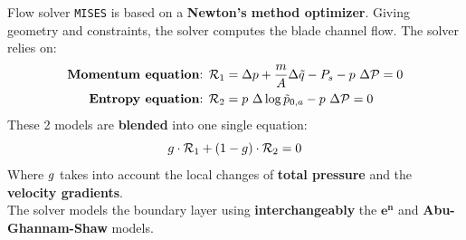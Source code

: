 \begin{frame}{Flow solver}
    \texttt{MISES} is based on a \textbf{Newton's method optimizer}. Giving geometry and constraints, the solver computes the blade channel flow. 
    The solver relies on:
    \begin{align*}
        \text{\textbf{Momentum equation}: }\mathcal{R}_1 & = \Delta p + \frac{m}{A} \Delta \tilde{q} - P_s - p \ \Delta \mathcal{P} = 0 \\
        \text{\textbf{Entropy equation}: }\mathcal{R}_2 & = p \ \Delta \log{\tilde{p}_{0, a}} - p \ \Delta \mathcal{P} = 0
    \end{align*}
    These 2 models are \textbf{blended} into one single equation:
    \begin{equation*}
        \mathnormal{g} \cdot \mathcal{R}_1 + (1 - \mathnormal{g}) \cdot \mathcal{R}_2 = 0
    \end{equation*}
    Where $\mathnormal{g}$ takes into account the local changes of \textbf{total pressure} and the \textbf{velocity gradients}.
    \\ [0.5cm]
    The solver models the boundary layer using \textbf{interchangeably} the $\boldsymbol{e^n}$ and \textbf{Abu-Ghannam-Shaw} models.
\end{frame}

